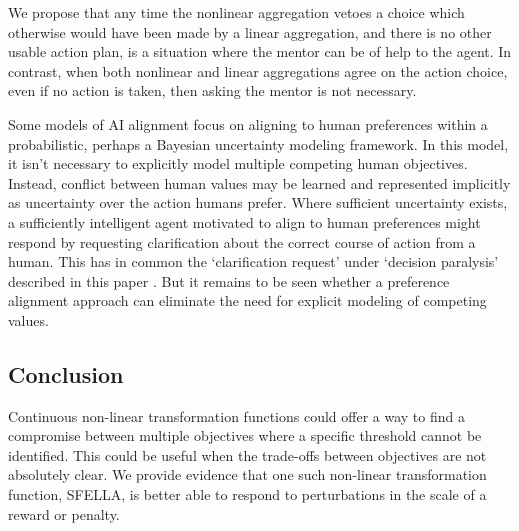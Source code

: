 We propose that any time the nonlinear aggregation vetoes a choice which otherwise would have been made by a linear aggregation, and there is no other usable action plan, is a situation where the mentor can be of help to the agent. %
In contrast, when both nonlinear and linear aggregations agree on the action choice, even if no action is taken, then asking the mentor is not necessary.

Some models of AI alignment focus on \cite{russell2019human} aligning to human preferences within a probabilistic, perhaps a Bayesian uncertainty modeling framework.  In this model, it isn't necessary to explicitly model multiple competing human objectives. Instead, conflict between human values may be learned and represented implicitly as uncertainty over the action humans prefer. Where sufficient uncertainty exists, a sufficiently intelligent agent motivated to align to human preferences might respond by requesting clarification about the correct course of action from a human. This has in common the `clarification request' under `decision paralysis' described in this paper%
. But it remains to be seen whether a preference alignment approach can eliminate the need for explicit modeling of competing values.

\subsection{Conclusion}

Continuous non-linear transformation functions could offer a way to find a compromise between multiple objectives where a specific threshold cannot be identified. This could be useful when the trade-offs between objectives are not absolutely clear. We provide evidence that one such non-linear transformation function, SFELLA, is better able to respond to perturbations in the scale of a reward or penalty.